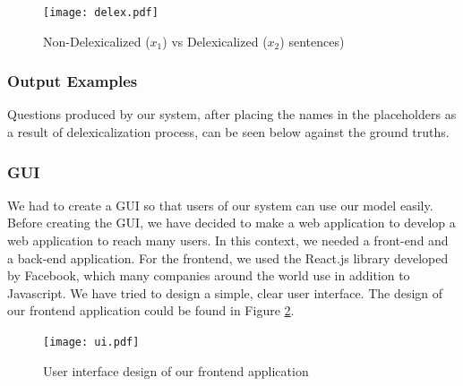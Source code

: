 \documentclass{mefsdp}
\begin{document}
	\begin{figure}[h!]
		\centering
		\texttt{[image: delex.pdf]}
		\caption{Non-Delexicalized ($x_1$) vs Delexicalized ($x_2$) sentences)\label{delex}}
	\end{figure}

	\subsubsection{Output Examples}
	Questions produced by our system, after placing the names in the placeholders as a result of delexicalization process, can be seen below against the ground truths. 
	\newline
	
	\noindent
	\newline
	
	\noindent
	\newline

	\noindent
	\subsubsection{GUI}
	We had to create a GUI so that users of our system can use our model easily. Before creating the GUI, we have decided to make a web application to develop a web application to reach many users. In this context, we needed a front-end and a back-end application. For the frontend, we used the React.js library developed by Facebook, which many companies around the world use in addition to Javascript. We have tried to design a simple, clear user interface. The design of our frontend application could be found in Figure \ref{ui}. 
	
	\begin{figure}[h!]
		\centering
		\texttt{[image: ui.pdf]}
		\caption{User interface design of our frontend application}
		\label{ui}
	\end{figure}
	
\end{document}
